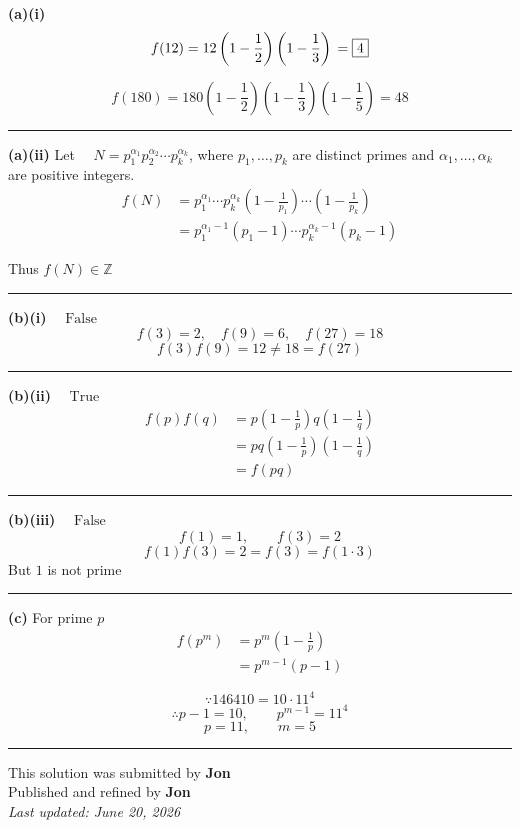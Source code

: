 \documentclass[12pt]{article}
\begin{document}
\newcommand{\ds}{\displaystyle}

\textbf{(a)(i)}
$$f(12)=12\left(1-\frac12\right)\left(1-\frac13\right)\\=\boxed{4}$$

$$f(180)=180\left(1-\frac12\right)\left(1-\frac13\right)\left(1-\frac15\right)=\boxed{48}$$

\bigskip\hrule\bigskip

\textbf{(a)(ii)} Let $\quad\displaystyle  N=p_1^{\alpha_1}p_2^{\alpha_2}\cdots p_k^{\alpha_k}$, where $p_1,\ldots,p_k$ are distinct primes and $\alpha_1,\ldots,\alpha_k$ are positive integers.
\begin{align*}
f(N)
&=p_1^{\alpha_1}\cdots p_k^{\alpha_k}
\left(1-\frac1{p_1}\right)\cdots
\left(1-\frac1{p_k}\right)\\
&=p_1^{\alpha_1-1}(p_1-1)\cdots
p_k^{\alpha_k-1}(p_k-1)
\end{align*}

Thus $\displaystyle f(N)\in\mathbb Z$

\bigskip\hrule\bigskip

\textbf{(b)(i)} $\quad \boxed{\text{False}}$
$$f(3)=2,\quad f(9)=6, \quad f(27)=18$$
$$f(3)f(9)=12\neq18=f(27)$$


\bigskip\hrule\bigskip

\textbf{(b)(ii)} $\quad \boxed{\text{True}}$
\begin{align*}
f(p)f(q)
&=p\left(1-\frac1p\right)
q\left(1-\frac1q\right)\\
&=pq\left(1-\frac1p\right)\left(1-\frac1q\right)\\
&=f(pq)
\end{align*}

\bigskip\hrule\bigskip

\textbf{(b)(iii)} $\quad \boxed{\text{False}}$
$$f(1)=1,\qquad f(3)=2$$
$$f(1)f(3)=2=f(3)=f(1\cdot3)$$
But $1$ is not prime

\bigskip\hrule\bigskip

\textbf{(c)} For prime $p$
\begin{align*}
f(p^m)
&=p^m\left(1-\frac1p\right)\\
&=p^{m-1}(p-1)
\end{align*}

$$\because 146410=10\cdot11^4$$
$$\therefore p-1=10,\qquad p^{m-1}=11^4$$
$$\boxed{p=11,\qquad m=5}$$

\bigskip
\hrule

\begin{center}
	This solution was submitted by \textbf{Jon}\\[4pt]
	Published and refined by \textbf{Jon}\\[8pt]
	\textit{Last updated: June 20, 2026}
\end{center}
\end{document}
